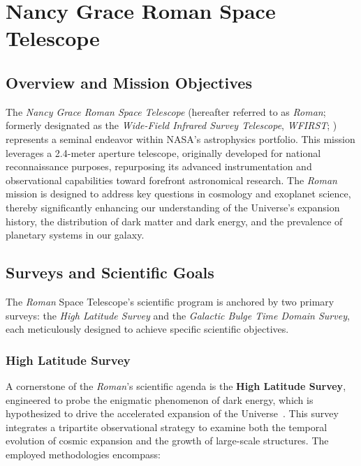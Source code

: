 \section{Nancy Grace Roman Space Telescope}

\subsection{Overview and Mission Objectives}

The \emph{Nancy Grace Roman Space Telescope} (hereafter referred to as \emph{Roman}; formerly designated as the \emph{Wide-Field Infrared Survey Telescope}, \textit{WFIRST}; \citealt{2015arXiv150303757S}) represents a seminal endeavor within NASA's astrophysics portfolio. This mission leverages a 2.4-meter aperture telescope, originally developed for national reconnaissance purposes, repurposing its advanced instrumentation and observational capabilities toward forefront astronomical research. The \emph{Roman} mission is designed to address key questions in cosmology and exoplanet science, thereby significantly enhancing our understanding of the Universe's expansion history, the distribution of dark matter and dark energy, and the prevalence of planetary systems in our galaxy.

\subsection{Surveys and Scientific Goals}

The \emph{Roman} Space Telescope's scientific program is anchored by two primary surveys: the \emph{High Latitude Survey} and the \emph{Galactic Bulge Time Domain Survey}, each meticulously designed to achieve specific scientific objectives.

\subsubsection{High Latitude Survey}

A cornerstone of the \emph{Roman}'s scientific agenda is the \textbf{High Latitude Survey}, engineered to probe the enigmatic phenomenon of dark energy, which is hypothesized to drive the accelerated expansion of the Universe~\cite{1998AJ....116.1009R, 1999ApJ...517..565P}. This survey integrates a tripartite observational strategy to examine both the temporal evolution of cosmic expansion and the growth of large-scale structures. The employed methodologies encompass:


